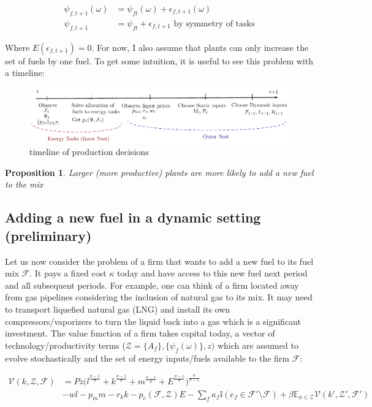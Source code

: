 \documentclass{article}
\newtheorem{prop}{Proposition}
\begin{document}
\begin{align*}
    \psi_{f,t+1}(\omega) &= \psi_{ft}(\omega) + \epsilon_{f,t+1}(\omega) \\
    \psi_{f,t+1} &= \psi_{ft} + \epsilon_{f,t+1} \text{  by symmetry of tasks}
\end{align*}

Where $E(\epsilon_{f,t+1}) = 0$. For now, I also assume that plants can only increase the set of fuels by one fuel. To get some intuition, it is useful to see this problem with a timeline:

\begin{figure}[htp]
    \centering
    \includegraphics[width=\linewidth]{timeline.pdf}
    \caption{timeline of production decisions}
    \label{fig:my_label}
\end{figure}

\begin{prop}
    Larger (more productive) plants are more likely to add a new fuel to the mix
\end{prop}





\subsection{Adding a new fuel in a dynamic setting (preliminary)}

Let us now consider the problem of a firm that wants to add a new fuel to its fuel mix $\mathcal{F}$. It pays a fixed cost $\kappa$ today and have access to this new fuel next period and all subsequent periods. For example, one can think of a firm located away from gas pipelines considering the inclusion of natural gas to its mix. It may need to transport liquefied natural gas (LNG) and install its own compressors/vaporizers to turn the liquid back into a gas which is a significant investment. The value function of a firm takes capital today, a vector of technology/productivity terms ($\mathcal{Z} = \{A_f\}, \{ \psi_f(\omega) \},z)$ which are assumed to evolve stochastically and the set of energy inputs/fuels available to the firm $\mathcal{F}$:

\begin{align*}
    \mathcal{V}(k,\mathcal{Z},\mathcal{F}) &= P z \Big( l^{\frac{\sigma-1}{\sigma}} + k^{\frac{\sigma-1}{\sigma}} + m^{\frac{\sigma-1}{\sigma}} + E^{\frac{\sigma-1}{\sigma}}\Big)^{\frac{\sigma}{\sigma-1}} \\ 
    & - wl - p_m m - r_k k - p_e(\mathcal{F},\mathcal{Z}) E - \sum_f\kappa_f \mathbb{I}(e_f \in \mathcal{F'} \setminus \mathcal{F}) + \beta \mathbb{E}_{x \in \mathcal{Z}} \mathcal{V}(k',\mathcal{Z'},\mathcal{F'})
\end{align*}
\end{document}
